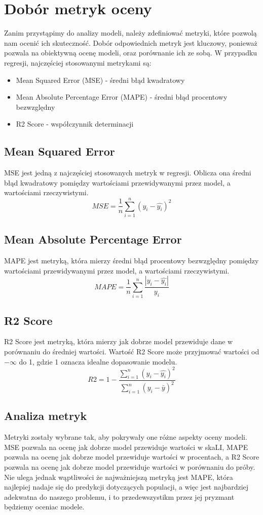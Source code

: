\documentclass[11pt]{article}
\begin{document}
\section{Dobór metryk oceny}
Zanim przystąpimy do analizy modeli, należy zdefiniować metryki, które pozwolą nam ocenić ich skuteczność.
Dobór odpowiednich metryk jest kluczowy, ponieważ pozwala na obiektywną ocenę modeli, oraz porównanie ich ze sobą.
W przypadku regresji, najczęściej stosowanymi metrykami są:
\begin{itemize}
\item Mean Squared Error (MSE) - średni błąd kwadratowy
\item Mean Absolute Percentage Error (MAPE) - średni błąd procentowy bezwzględny
\item R2 Score - współczynnik determinacji
\end{itemize}
\subsection{Mean Squared Error}
MSE jest jedną z najczęściej stosowanych metryk w regresji. Oblicza ona średni błąd kwadratowy pomiędzy wartościami przewidywanymi przez model, a wartościami rzeczywistymi.
\begin{equation}
MSE = \frac{1}{n} \sum_{i=1}^{n} (y_i - \hat{y_i})^2
\end{equation}
\subsection{Mean Absolute Percentage Error}
MAPE jest metryką, która mierzy średni błąd procentowy bezwzględny pomiędzy wartościami przewidywanymi przez model, a wartościami rzeczywistymi.
\begin{equation}
MAPE = \frac{1}{n} \sum_{i=1}^{n} \frac{|y_i - \hat{y_i}|}{y_i}
\end{equation}
\subsection{R2 Score}
R2 Score jest metryką, która mierzy jak dobrze model przewiduje dane w porównaniu do średniej wartości. Wartość R2 Score może przyjmować wartości od $-\infty$
  do 1, gdzie 1 oznacza idealne dopasowanie modelu.
\begin{equation}
R2 = 1 - \frac{\sum_{i=1}^{n} (y_i - \hat{y_i})^2}{\sum_{i=1}^{n} (y_i - \bar{y})^2}
\end{equation}
\subsection{Analiza metryk}
Metryki zostały wybrane tak, aby pokrywały one różne aspekty oceny modeli. MSE pozwala na ocenę jak dobrze model przewiduje wartości w skaLI, MAPE pozwala na ocenę jak dobrze model przewiduje wartości w procentach, a R2 Score pozwala na ocenę jak dobrze model przewiduje wartości w porównaniu do próby.
Nie ulega jednak wąptliwości że najważniejszą metryką jest MAPE, która najlepiej nadaje się do predykcji dotyczących populacji\cite{dop}, a więc jest najbardziej adekwatna do naszego problemu, i to przedewszystikm przez jej pryzmant będziemy oceniac modele.
\end{document}
